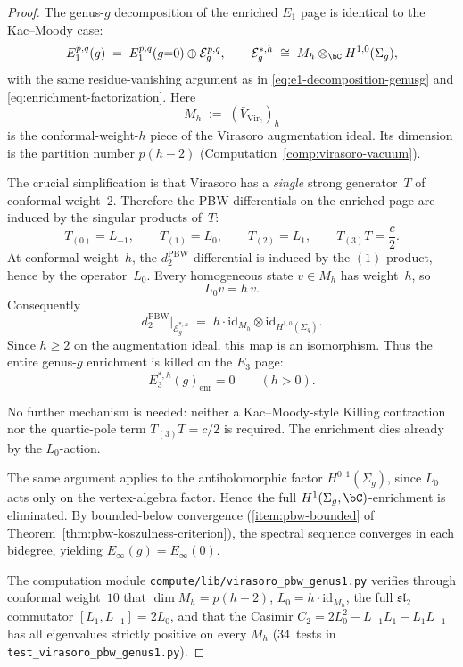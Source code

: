 \begin{proof}
The genus-$g$ decomposition of the enriched $E_1$ page is identical to
the Kac--Moody case:
\[
E_1^{p,q}(g) \;=\; E_1^{p,q}(g{=}0) \oplus \mathcal{E}^{p,q}_g,
\qquad
\mathcal{E}_g^{*,h} \;\cong\; M_h \otimes_{\bC} H^{1,0}(\Sigma_g),
\]
with the same residue-vanishing argument as in
\eqref{eq:e1-decomposition-genusg} and
\eqref{eq:enrichment-factorization}.  Here
\[
M_h \;:=\; (\bar{V}_{\mathrm{Vir}_c})_h
\]
is the conformal-weight-$h$ piece of the Virasoro augmentation ideal.
Its dimension is the partition number $p(h-2)$
\textup{(}Computation~\textup{\ref{comp:virasoro-vacuum}}\textup{)}.

The crucial simplification is that Virasoro has a \emph{single}
strong generator~$T$ of conformal weight~$2$.  Therefore the PBW
differentials on the enriched page are induced by the singular
products of~$T$:
\[
T_{(0)} = L_{-1}, \qquad
T_{(1)} = L_0, \qquad
T_{(2)} = L_1, \qquad
T_{(3)}T = \frac{c}{2}.
\]
At conformal weight~$h$, the $d_2^{\mathrm{PBW}}$ differential is
induced by the $(1)$-product, hence by the operator~$L_0$.
Every homogeneous state $v \in M_h$ has weight~$h$, so
\[
L_0 v = h\,v.
\]
Consequently
\[
d_2^{\mathrm{PBW}}\big|_{\mathcal{E}_g^{*,h}}
\;=\;
h \cdot \mathrm{id}_{M_h}
\otimes
\mathrm{id}_{H^{1,0}(\Sigma_g)}.
\]
Since $h \geq 2$ on the augmentation ideal, this map is an
isomorphism.  Thus the entire genus-$g$ enrichment is killed on the
$E_3$ page:
\[
E_3^{*,h}(g)_{\mathrm{enr}} = 0
\qquad (h > 0).
\]

No further mechanism is needed: neither a Kac--Moody-style Killing
contraction nor the quartic-pole term $T_{(3)}T = c/2$ is required.
The enrichment dies already by the $L_0$-action.

The same argument applies to the antiholomorphic factor
$H^{0,1}(\Sigma_g)$, since $L_0$ acts only on the vertex-algebra
factor.  Hence the full $H^1(\Sigma_g,\bC)$-enrichment is eliminated.
By bounded-below convergence
\textup{(}\ref{item:pbw-bounded} of
Theorem~\ref{thm:pbw-koszulness-criterion}\textup{)}, the spectral
sequence converges in each bidegree, yielding
$E_\infty(g) = E_\infty(0)$.

The computation module
\texttt{compute/lib/virasoro\_pbw\_genus1.py}
verifies through conformal weight~$10$ that
$\dim M_h = p(h-2)$,
$L_0 = h \cdot \mathrm{id}_{M_h}$,
the full $\mathfrak{sl}_2$ commutator $[L_1, L_{-1}] = 2L_0$,
and that the Casimir $C_2 = 2L_0^2 - L_{-1}L_1 - L_1L_{-1}$
has all eigenvalues strictly positive on every $M_h$
(34~tests in \texttt{test\_virasoro\_pbw\_genus1.py}).
\end{proof}

